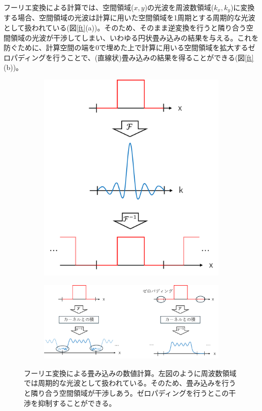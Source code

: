 \documentclass[a4paper,11pt,uplatex]{jsbook}
\begin{document}
フーリエ変換による計算では、空間領域($x,y$)の光波を周波数領域($k_x,k_y$)に変換する場合、空間領域の光波は計算に用いた空間領域を1周期とする周期的な光波として扱われている(図\ref{ft}(a))。そのため、そのまま逆変換を行うと隣り合う空間領域の光波が干渉してしまい、いわゆる円状畳み込みの結果を与える。これを防ぐために、計算空間の端を0で埋めた上で計算に用いる空間領域を拡大するゼロパディングを行うことで、(直線状)畳み込みの結果を得ることができる(図\ref{ft}(b))。
\begin{figure}
  \centering
  \begin{subfigure}[h]{0.3\linewidth}
    \centering
    \includegraphics[width=\linewidth]{image/4-ft.png}
  \end{subfigure}
  \hfill
  \begin{subfigure}[h]{0.65\linewidth}
    \centering
    \includegraphics[width=\linewidth]{image/4-ft_zeropadding.png}
  \end{subfigure}
  \caption[フーリエ変換による畳み込みの数値計算]{フーリエ変換による畳み込みの数値計算。左図のように周波数領域では周期的な光波として扱われている。そのため、畳み込みを行うと隣り合う空間領域が干渉しあう。ゼロパディングを行うとこの干渉を抑制することができる。}
\end{figure}\label{ft}
\end{document}

